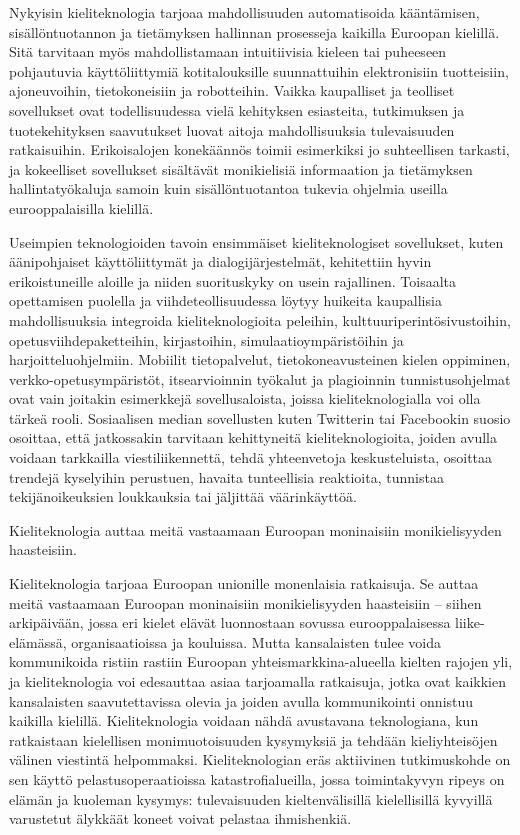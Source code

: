 \documentclass[]{../../metanetpaper}
\begin{document}
\begin{Parallel}[c]{77mm}{77mm}
{Nykyisin kieliteknologia tarjoaa mahdollisuuden automatisoida kääntämisen,
sisällöntuotannon ja tietämyksen hallinnan prosesseja kaikilla Euroopan
kielillä. Sitä tarvitaan myös mahdollistamaan intuitiivisia kieleen tai
puheeseen pohjautuvia käyttöliittymiä kotitalouksille suunnattuihin
elektronisiin tuotteisiin, ajoneuvoihin, tietokoneisiin ja robotteihin. Vaikka
kaupalliset ja teolliset sovellukset ovat todellisuudessa vielä kehityksen
esiasteita, tutkimuksen ja tuotekehityksen saavutukset luovat aitoja
mahdollisuuksia tulevaisuuden ratkaisuihin. Erikoisalojen konekäännös toimii
esimerkiksi jo suhteellisen tarkasti, ja kokeelliset sovellukset sisältävät
monikielisiä informaation ja tietämyksen hallintatyökaluja samoin kuin
sisällöntuotantoa tukevia ohjelmia useilla eurooppalaisilla kielillä.

Useimpien teknologioiden tavoin ensimmäiset kieliteknologiset sovellukset,
kuten äänipohjaiset käyttöliittymät ja dialogijärjestelmät, kehitettiin hyvin
erikoistuneille aloille ja niiden suorituskyky on usein rajallinen. Toisaalta
opettamisen puolella ja viihdeteollisuudessa löytyy huikeita kaupallisia
mahdollisuuksia integroida kieliteknologioita peleihin,
kulttuuriperintösivustoihin, opetusviihdepaketteihin, kirjastoihin,
simulaatioympäristöihin ja harjoitteluohjelmiin. Mobiilit tietopalvelut,
tietokoneavusteinen kielen oppiminen, verkko-opetusympäristöt, itsearvioinnin
työkalut ja plagioinnin tunnistusohjelmat ovat vain joitakin esimerkkejä
sovellusaloista, joissa kieliteknologialla voi olla tärkeä rooli. Sosiaalisen
median sovellusten kuten Twitterin tai Facebookin suosio osoittaa, että
jatkossakin tarvitaan kehittyneitä kieliteknologioita, joiden avulla voidaan
tarkkailla viestiliikennettä, tehdä yhteenvetoja keskusteluista, osoittaa
trendejä kyselyihin perustuen, havaita tunteellisia reaktioita, tunnistaa
tekijänoikeuksien loukkauksia tai jäljittää väärinkäyttöä.

Kieliteknologia auttaa meitä vastaamaan Euroopan moninaisiin monikielisyyden
haasteisiin.



Kieliteknologia tarjoaa Euroopan unionille monenlaisia ratkaisuja. Se auttaa
meitä vastaamaan Euroopan moninaisiin monikielisyyden haasteisiin – siihen
arkipäivään, jossa eri kielet elävät luonnostaan sovussa eurooppalaisessa
liike-elämässä, organisaatioissa ja kouluissa. Mutta kansalaisten tulee voida
kommunikoida ristiin rastiin Euroopan yhteismarkkina-alueella kielten rajojen
yli, ja kieliteknologia voi edesauttaa asiaa tarjoamalla ratkaisuja, jotka ovat
kaikkien kansalaisten saavutettavissa olevia ja joiden avulla kommunikointi
onnistuu kaikilla kielillä. Kieliteknologia voidaan nähdä avustavana
teknologiana, kun ratkaistaan kielellisen monimuotoisuuden kysymyksiä ja
tehdään kieliyhteisöjen välinen viestintä helpommaksi. Kieliteknologian eräs
aktiivinen tutkimuskohde on sen käyttö pelastusoperaatioissa
katastrofialueilla, jossa toimintakyvyn ripeys on elämän ja kuoleman kysymys:
tulevaisuuden kieltenvälisillä kielellisillä kyvyillä varustetut älykkäät
koneet voivat pelastaa ihmishenkiä.

}
\end{Parallel}
\end{document}
